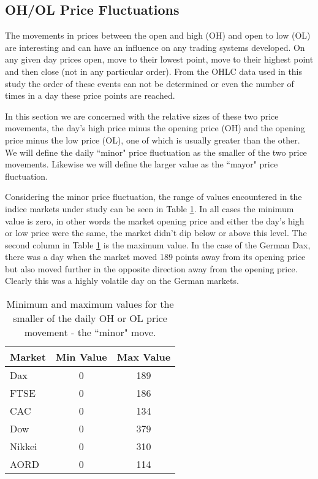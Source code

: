 \subsection{OH/OL Price Fluctuations}
\label{sec:ohol:fluctuation}
The movements in prices between the open and high (OH) and open to low (OL) are interesting and can have an influence on any trading systems developed. On any given day prices open, move to their lowest point, move to their highest point and then close (not in any particular order). From the OHLC data used in this study the order of these events can not be determined or even the number of times in a day these price points are reached. 

In this section we are concerned with the relative sizes of these two price movements, the day's high price minus the opening price (OH) and the opening price minus the low price (OL), one of which is usually greater than the other. We will define the daily \textquotedblleft minor" price fluctuation as the smaller of the two price movements. Likewise we will define the larger value as the \textquotedblleft mayor" price fluctuation.

Considering the minor price fluctuation, the range of values encountered in the indice markets under study can be seen in Table \ref{tab:minorOH}. In all cases the minimum value is zero, in other words the market opening price and either the day's high or low price were the same, the market didn't dip below or above this level. The second column in Table \ref{tab:minorOH} is the maximum value. In the case of the German Dax, there was a day when the market moved 189 points away from its opening price but also moved further in the opposite direction away from the opening price. Clearly this was a highly volatile day on the German markets.

\begin{table}[!h] \centering 
  \caption[Minor daily price fluctuation]{Minimum and maximum values for the smaller of the daily OH or OL price movement - the \textquotedblleft minor" move.} 
  \label{tab:minorOH}
\begin{tabular}{lcc} 
\toprule 
Market & Min Value & Max Value  \\ 
\midrule
Dax  & 0 & 189  \\ 
FTSE & 0 & 186  \\ 
CAC  & 0 & 134  \\ 
Dow  & 0 & 379  \\ 
Nikkei & 0 & 310  \\ 
AORD   & 0 & 114  \\ 
\bottomrule
\end{tabular} 
\end{table} 


